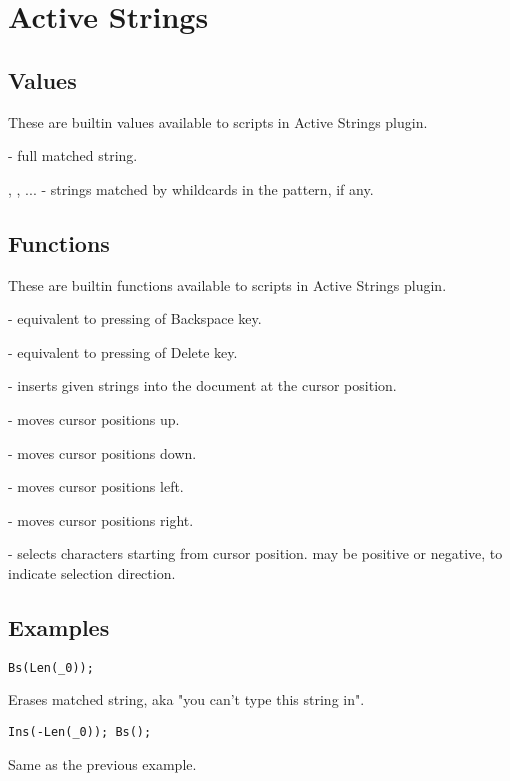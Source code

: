 \chapter{Active Strings}

\section{Values}

These are builtin values available to scripts in Active Strings plugin.

 - full matched string.

, , ... - strings matched by whildcards in the 
pattern, if any.


\section{Functions}

These are builtin functions available to scripts in Active Strings plugin.

 - equivalent to  pressing of Backspace key.

 - equivalent to  pressing of Delete key.

 - inserts given strings into the document at the 
cursor position.

 - moves cursor  positions up.

 - moves cursor  positions down.

 - moves cursor  positions left.

 - moves cursor  positions right.

 - selects  characters starting from cursor
position.  may be positive or negative, to indicate selection
direction.


\section{Examples}

\begin{verbatim}
Bs(Len(_0));
\end{verbatim}
Erases matched string, aka "you can't type this string in".

\begin{verbatim}
Ins(-Len(_0)); Bs();
\end{verbatim}
Same as the previous example.
